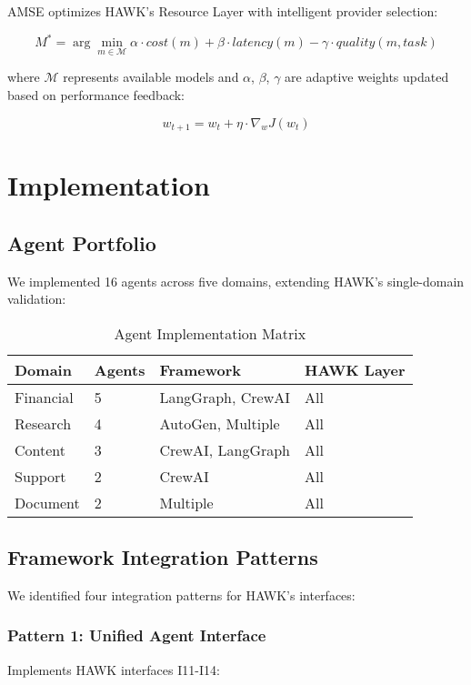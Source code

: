 \documentclass[conference]{IEEEtran}
\begin{document}
AMSE optimizes HAWK's Resource Layer with intelligent provider selection:

\begin{equation}
M^* = \arg\min_{m \in \mathcal{M}} \alpha \cdot cost(m) + \beta \cdot latency(m) - \gamma \cdot quality(m, task)
\end{equation}

where $\mathcal{M}$ represents available models and $\alpha$, $\beta$, $\gamma$ are adaptive weights updated based on performance feedback:

\begin{equation}
w_{t+1} = w_t + \eta \cdot \nabla_w J(w_t)
\end{equation}

\section{Implementation}

\subsection{Agent Portfolio}

We implemented 16 agents across five domains, extending HAWK's single-domain validation:

\begin{table}[htbp]
\centering
\caption{Agent Implementation Matrix}
\label{tab:agents}
\begin{tabular}{@{}llll@{}}
\toprule
\textbf{Domain} & \textbf{Agents} & \textbf{Framework} & \textbf{HAWK Layer} \\
\midrule
Financial & 5 & LangGraph, CrewAI & All \\
Research & 4 & AutoGen, Multiple & All \\
Content & 3 & CrewAI, LangGraph & All \\
Support & 2 & CrewAI & All \\
Document & 2 & Multiple & All \\
\bottomrule
\end{tabular}
\end{table}

\subsection{Framework Integration Patterns}

We identified four integration patterns for HAWK's interfaces:

\subsubsection{Pattern 1: Unified Agent Interface}
Implements HAWK interfaces I11-I14:
\end{document}
